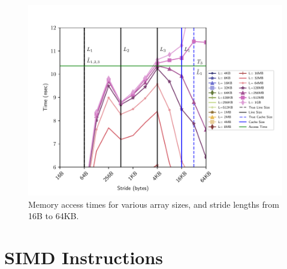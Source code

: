 \documentclass[letterpaper]{article}
\begin{document}
\begin{figure}[H]
  \centering
  \includegraphics[width=\textwidth]{figures/membench_middleupper.pdf}
  \caption{Memory access times for various array sizes, and stride lengths from 16B to 64KB.}
  \label{fig:membench_middleupper}
\end{figure}


\section{SIMD Instructions}
\end{document}
